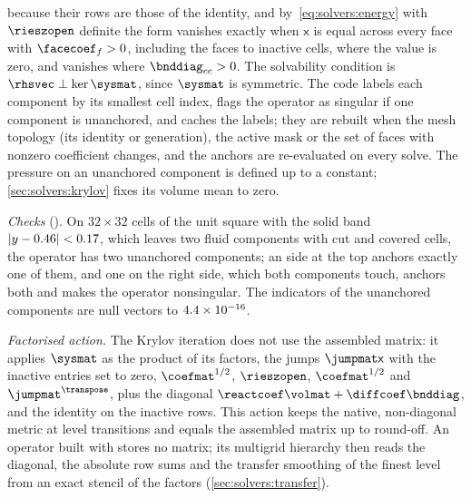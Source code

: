 because their rows are those of the identity, and by~\cref{eq:solvers:energy}
with $\rieszopen$ definite the form vanishes exactly when $\mathsf{x}$ is
equal across every face with $\facecoef_f>0$, including the faces to inactive
cells, where the value is zero, and vanishes where $\bnddiag_{cc}>0$. The
solvability condition is $\rhsvec\perp\ker\sysmat$, since $\sysmat$ is
symmetric. The code labels each component by its smallest cell index, flags
the operator as singular if one component is unanchored, and caches the
labels; they are rebuilt when the mesh topology (its identity or generation),
the active mask or the set of faces with nonzero coefficient changes, and the
anchors are re-evaluated on every solve. The pressure on an unanchored
component is defined up to a constant; \cref{sec:solvers:krylov} fixes its
volume mean to zero.

\emph{Checks} (). On $32\times32$ cells of the unit
square with the solid band $\left\lvert y-0.46 \right\rvert<0.17$, which leaves two fluid
components with cut and covered cells, the operator has two unanchored
components; an  side at the top anchors exactly one of them,
and one on the right side, which both components touch, anchors both and makes
the operator nonsingular. The indicators of the unanchored components are null
vectors to $4.4\times10^{-16}$.

\emph{Factorised action.} The Krylov iteration does not use the assembled
matrix: it applies $\sysmat$ as the product of its factors, the jumps
$\jumpmat\mathsf{x}$ with the inactive entries set to zero, $\coefmat^{1/2}$,
$\rieszopen$, $\coefmat^{1/2}$ and $\jumpmat^{\transpose}$, plus the diagonal
$\reactcoef\volmat+\diffcoef\bnddiag$, and the identity on the inactive rows.
This action keeps the native, non-diagonal metric at level transitions and
equals the assembled matrix up to round-off. An operator built with
 stores no matrix; its multigrid hierarchy then
reads the diagonal, the absolute row sums and the transfer smoothing of the
finest level from an exact stencil of the factors
(\cref{sec:solvers:transfer}).

